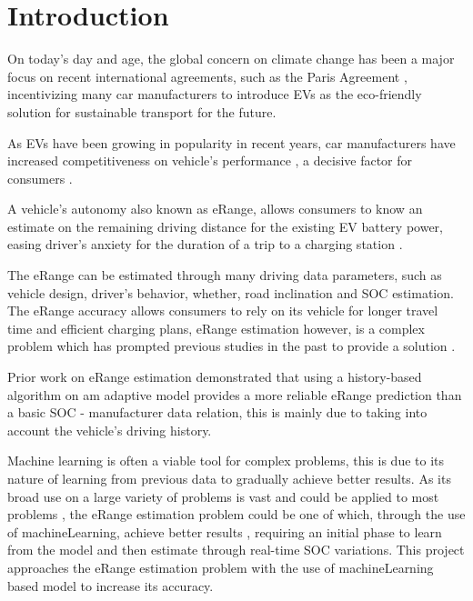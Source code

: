 \chapter{Introduction}
\label{cha:introduction}

On today's day and age, the global concern on climate
change has been a major focus on recent international agreements,
such as the Paris Agreement \citep{parisAgreement},
incentivizing many car manufacturers to introduce
\gls{EVs} as the eco-friendly
solution for sustainable transport for the future.

As \gls{EVs} have been growing in popularity in
recent years, car manufacturers have
increased competitiveness on vehicle's performance
\citep{evCompetitiveness}, a decisive factor 
for consumers \citep{EGBUE2012717}.

A vehicle's autonomy also known as \gls{eRange},
allows consumers to know an estimate on the
remaining driving distance for the existing \gls{EV}
battery power, easing driver's anxiety for the duration
of a trip to a charging station \citep{eRangeFactors}.

The \gls{eRange} can be estimated through many
driving data parameters,
such as vehicle design, driver's behavior, whether,
road inclination and \gls{SOC} estimation.
The \gls{eRange} accuracy allows consumers to rely
on its vehicle for longer travel time and efficient
charging plans, \gls{eRange} estimation
however, is a complex problem which has prompted
previous studies in the past to provide a solution 
\citep{classicEVX, predictionOfeRange}.

Prior work \citep{classicEVX} on \gls{eRange}
estimation demonstrated that using a
history-based algorithm on am adaptive model
provides a more reliable \gls{eRange} prediction
than a basic \gls{SOC} - manufacturer data relation,
this is mainly due to taking into account the
vehicle's driving history.

Machine learning is often a viable tool for complex
problems, this is due to its nature of 
learning from previous data to 
gradually achieve better results.
As its broad use on a large variety of problems 
is vast and could be applied to most problems
\citep{mitchelllearning}, the \gls{eRange}
 estimation problem could be one of which, 
through the use of \gls{machineLearning}, 
achieve better results \cite{predictionOfeRange},
requiring an initial phase to learn from 
the model and then estimate through real-time \gls{SOC} variations.
This project approaches the \gls{eRange} estimation
problem with the use of \gls{machineLearning} based
model to increase its accuracy.

